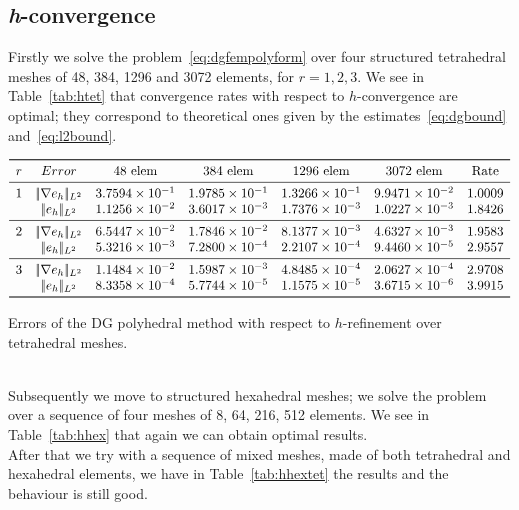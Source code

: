 \documentclass[12pt, a4paper]{article}
\theoremstyle{definition}
\theoremstyle{plain}
\theoremstyle{plain}
\begin{document}
\subsection{\textit{h}-convergence}
Firstly we solve the problem~\eqref{eq:dgfempolyform} over four structured tetrahedral meshes of 48, 
384, 1296 and 3072 elements, for $r=1,2,3$. We see in Table~\ref{tab:htet} that convergence rates with respect to $h$-convergence are optimal; they correspond to theoretical ones given by the estimates~\eqref{eq:dgbound} and~\eqref{eq:l2bound}.
\begin{table}[h]\footnotesize
	\centering
	\[
	\begin{array}{ccccccc}
	\toprule
	r & Error & \text{48 elem} & \text{384 elem} & \text{1296 elem} & \text{3072 elem} & \text{Rate} \\ 
	\midrule
	1 & |\!|\nabla e_{h}|\!|_{L^2}   & 3.7594 \times 10^{-1} & 1.9785 \times 10^{-1} & 1.3266 \times 10^{-1} & 9.9471 \times 10^{-2} & 1.0009\\
	& |\!|e_{h}|\!|_{L^2} & 1.1256 \times 10^{-2} & 3.6017 \times 10^{-3} & 1.7376 \times 10^{-3} & 1.0227 \times 10^{-3} & 1.8426\\
	\midrule
	2 & |\!|\nabla e_{h}|\!|_{L^2}   & 6.5447 \times 10^{-2} & 1.7846 \times 10^{-2} & 8.1377 \times 10^{-3} & 4.6327 \times 10^{-3} & 1.9583\\
	& |\!|e_{h}|\!|_{L^2} & 5.3216 \times 10^{-3} & 7.2800 \times 10^{-4} & 2.2107 \times 10^{-4} & 9.4460 \times 10^{-5} & 2.9557\\
	\midrule
	3 & |\!|\nabla e_{h}|\!|_{L^2}   & 1.1484 \times 10^{-2} & 1.5987 \times 10^{-3} & 4.8485 \times 10^{-4} & 2.0627 \times 10^{-4} & 2.9708\\
	& |\!|e_{h}|\!|_{L^2} & 8.3358 \times 10^{-4} & 5.7744 \times 10^{-5} & 1.1575 \times 10^{-5} & 3.6715 \times 10^{-6} & 3.9915\\
	\bottomrule
	\end{array}
	\]
	\caption{Errors of the DG polyhedral method with respect to $h$-refinement over tetrahedral meshes.} \label{tab:htet}
\end{table}
\\Subsequently we move to structured hexahedral meshes; we solve the problem over a sequence of four meshes of 8, 64, 216, 512 elements. We see in Table~\ref{tab:hhex} that again we can obtain optimal results.\\
After that we try with a sequence of mixed meshes, made of both tetrahedral and hexahedral elements, we have in Table~\ref{tab:hhextet} the results and the behaviour is still good.\\
\end{document}
